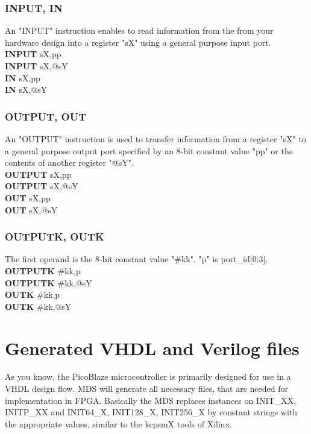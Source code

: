         \subsubsection{INPUT, IN}
            An "INPUT" instruction enables to read information from the from your hardware design into a register "sX" using a general purpose input port.\\
                \textbf{INPUT}      sX,pp\\
                \textbf{INPUT}      sX,@sY\\
                \textbf{IN}         sX,pp\\
                \textbf{IN}         sX,@sY\\
        \subsubsection{OUTPUT, OUT}
            An "OUTPUT" instruction is used to transfer information from a register "sX" to a general purpose output port specified by an 8-bit constant value "pp" or the
            contents of another register "@sY".\\
                \textbf{OUTPUT}     sX,pp\\
                \textbf{OUTPUT}     sX,@sY\\
                \textbf{OUT}        sX,pp\\
                \textbf{OUT}        sX,@sY\\
        \subsubsection{OUTPUTK, OUTK}
            The first operand is the 8-bit constant value "\#kk". "p" is port\_id[0:3].\\
                \textbf{OUTPUTK}     \#kk,p\\
                \textbf{OUTPUTK}     \#kk,@sY\\
                \textbf{OUTK}        \#kk,p\\
                \textbf{OUTK}        \#kk,@sY\\

        \section{Generated VHDL and Verilog files}
            As you know, the PicoBlaze microcontroller is primarily designed for use in a VHDL design flow.
            MDS will generate all necessary files, that are needed for
            implementation in FPGA. Basically the MDS replaces instances on
            {INIT\_XX}, {INITP\_XX} and {INIT64\_X}, {INIT128\_X}, {INIT256\_X} by constant strings with the appropriate values, similar to the kcpsmX tools of Xilinx.

